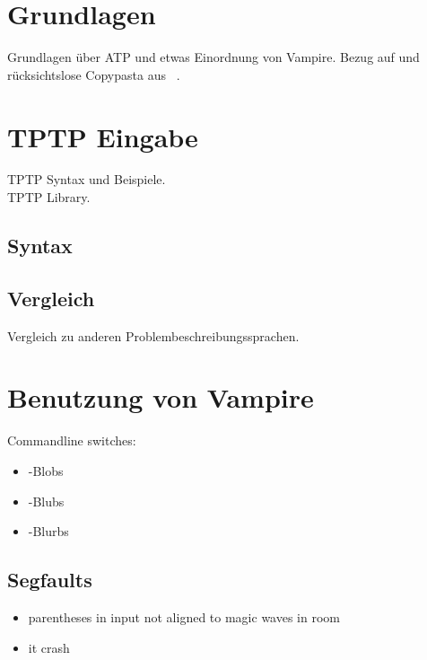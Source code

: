 \documentclass{acm_proc_article-sp-german}
\begin{document}
\section{Grundlagen}
\label{sec:foundations}

Grundlagen über ATP und etwas Einordnung von Vampire. Bezug auf und rücksichtslose Copypasta aus ~\cite{cav2013}.


\section{TPTP Eingabe}
\label{sec:input}

TPTP Syntax und Beispiele.\\
TPTP Library.

\subsection{Syntax}
\label{subsec:syntax}

\subsection{Vergleich}
\label{subsec:tptpcomp}
Vergleich zu anderen Problembeschreibungssprachen.


\section{Benutzung von Vampire}
\label{sec:invocation}

Commandline switches:

\begin{itemize}
\item -Blobs
\item -Blubs
\item -Blurbs
\end{itemize}

\subsection{Segfaults}
\label{subsec:segfaults}

\begin{itemize}
\item parentheses in input not aligned to magic waves in room
\item it crash
\end{itemize}
\end{document}
